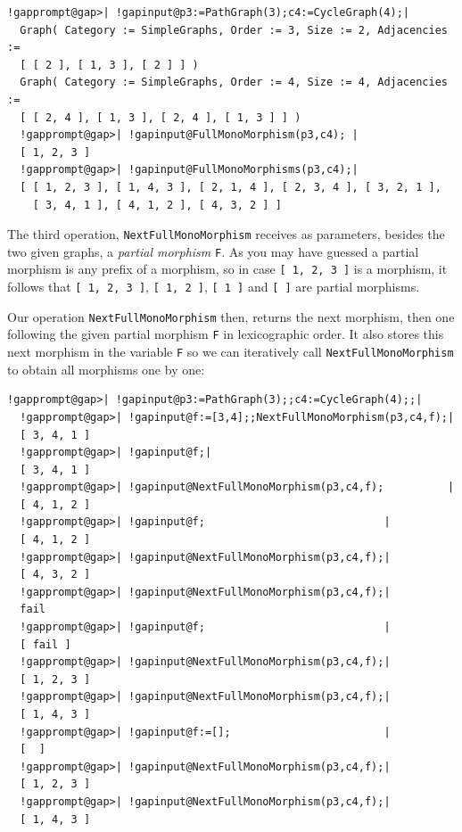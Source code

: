 \documentclass[a4paper,11pt]{report}
\begin{document}
{{ 
\begin{Verbatim}[commandchars=!@|,fontsize=\small,frame=single,label=Example]
  !gapprompt@gap>| !gapinput@p3:=PathGraph(3);c4:=CycleGraph(4);|
  Graph( Category := SimpleGraphs, Order := 3, Size := 2, Adjacencies := 
  [ [ 2 ], [ 1, 3 ], [ 2 ] ] )
  Graph( Category := SimpleGraphs, Order := 4, Size := 4, Adjacencies := 
  [ [ 2, 4 ], [ 1, 3 ], [ 2, 4 ], [ 1, 3 ] ] )
  !gapprompt@gap>| !gapinput@FullMonoMorphism(p3,c4); |
  [ 1, 2, 3 ]
  !gapprompt@gap>| !gapinput@FullMonoMorphisms(p3,c4);|
  [ [ 1, 2, 3 ], [ 1, 4, 3 ], [ 2, 1, 4 ], [ 2, 3, 4 ], [ 3, 2, 1 ], 
    [ 3, 4, 1 ], [ 4, 1, 2 ], [ 4, 3, 2 ] ]
\end{Verbatim}
 

The third operation, \texttt{NextFullMonoMorphism} receives as parameters, besides the two given graphs, a \emph{partial morphism} \texttt{F}. As you may have guessed a partial morphism is any prefix of a morphism, so
in case \texttt{[ 1, 2, 3 ]} is a morphism, it follows that \texttt{[ 1, 2, 3 ]}, \texttt{[ 1, 2 ]}, \texttt{[ 1 ]} and \texttt{[ ]} are partial morphisms. 

Our operation \texttt{NextFullMonoMorphism} then, returns the next morphism, then one following the given partial morphism \texttt{F} in lexicographic order. It also stores this next morphism in the variable \texttt{F} so we can iteratively call \texttt{NextFullMonoMorphism} to obtain all morphisms one by one: 

 
\begin{Verbatim}[commandchars=!@|,fontsize=\small,frame=single,label=Example]
  !gapprompt@gap>| !gapinput@p3:=PathGraph(3);;c4:=CycleGraph(4);;|
  !gapprompt@gap>| !gapinput@f:=[3,4];;NextFullMonoMorphism(p3,c4,f);|
  [ 3, 4, 1 ]
  !gapprompt@gap>| !gapinput@f;|
  [ 3, 4, 1 ]
  !gapprompt@gap>| !gapinput@NextFullMonoMorphism(p3,c4,f);          |
  [ 4, 1, 2 ]
  !gapprompt@gap>| !gapinput@f;                            |
  [ 4, 1, 2 ]
  !gapprompt@gap>| !gapinput@NextFullMonoMorphism(p3,c4,f);|
  [ 4, 3, 2 ]
  !gapprompt@gap>| !gapinput@NextFullMonoMorphism(p3,c4,f);|
  fail
  !gapprompt@gap>| !gapinput@f;                            |
  [ fail ]
  !gapprompt@gap>| !gapinput@NextFullMonoMorphism(p3,c4,f);|
  [ 1, 2, 3 ]
  !gapprompt@gap>| !gapinput@NextFullMonoMorphism(p3,c4,f);|
  [ 1, 4, 3 ]
  !gapprompt@gap>| !gapinput@f:=[];                        |
  [  ]
  !gapprompt@gap>| !gapinput@NextFullMonoMorphism(p3,c4,f);|
  [ 1, 2, 3 ]
  !gapprompt@gap>| !gapinput@NextFullMonoMorphism(p3,c4,f);|
  [ 1, 4, 3 ]
\end{Verbatim}
 

}}
\end{document}
